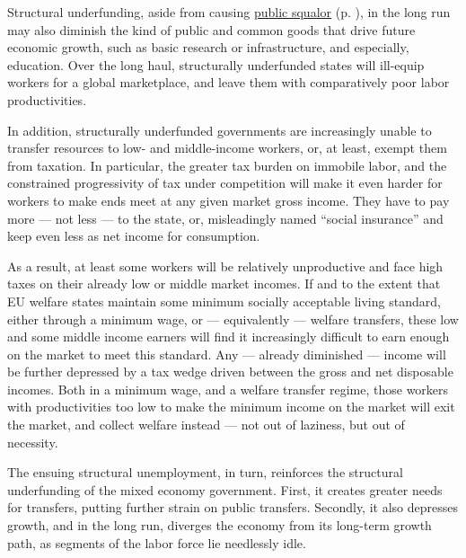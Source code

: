 \documentclass[11pt,a4paper,oneside,openright]{article}
\begin{document}
Structural underfunding, aside from causing \hyperref[sec:public-squalor]{public squalor} (p. \pageref{sec:public-squalor}), in the long run may also diminish the kind of public and common goods that drive future economic growth, such as basic research or infrastructure, and especially, education. 
Over the long haul, structurally underfunded states will ill-equip workers for a global marketplace, and leave them with comparatively poor labor productivities.

In addition, structurally underfunded governments are increasingly unable to transfer resources to low- and middle-income workers, or, at least, exempt them from taxation. 
In particular, the greater tax burden on immobile labor, and the constrained progressivity of tax under competition will make it even harder for workers to make ends meet at any given market gross income. 
They have to pay more --- not less --- to the state, or, misleadingly named ``social insurance'' and keep even less as net income for consumption.

As a result, at least some workers will be relatively unproductive and face high taxes on their already low or middle market incomes. 
If and to the extent that \gls{EU} welfare states maintain some minimum socially acceptable living standard, either through a minimum wage, or --- equivalently --- welfare transfers, these low and some middle income earners will find it increasingly difficult to earn enough on the market to meet this standard. 
Any --- already diminished --- income will be further depressed by a tax wedge driven between the gross and net disposable incomes. 
Both in a minimum wage, and a welfare transfer regime, those workers with productivities too low to make the minimum income on the market will exit the market, and collect welfare instead --- not out of laziness, but out of necessity. 

The ensuing structural unemployment, in turn, reinforces the structural underfunding of the mixed economy government. 
First, it creates greater needs for transfers, putting further strain on public transfers. 
Secondly, it also depresses growth, and in the long run, diverges the economy from its long-term growth path, as segments of the labor force lie needlessly idle.
\end{document}
